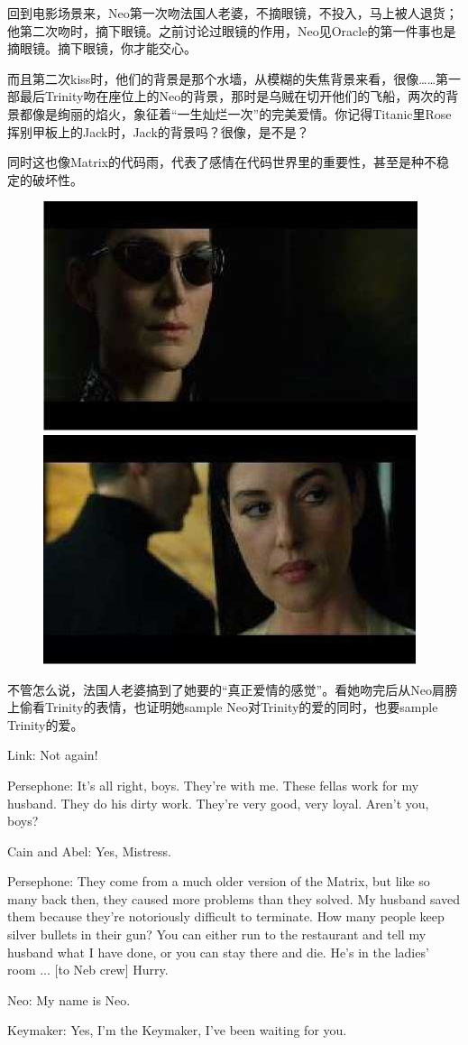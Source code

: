 \documentclass{ctexart}
\newenvironment{myquote}{\color{green} \setlength{\leftskip}{6em} \setlength{\rightskip}{4em} \setlength{\parindent}{-2em}}{\par}
\begin{document}
回到电影场景来，Neo第一次吻法国人老婆，不摘眼镜，不投入，马上被人退货；他第二次吻时，摘下眼镜。之前讨论过眼镜的作用，Neo见Oracle的第一件事也是摘眼镜。摘下眼镜，你才能交心。

而且第二次kiss时，他们的背景是那个水墙，从模糊的失焦背景来看，很像……第一部最后Trinity吻在座位上的Neo的背景，那时是乌贼在切开他们的飞船，两次的背景都像是绚丽的焰火，象征着“一生灿烂一次”的完美爱情。你记得Titanic里Rose挥别甲板上的Jack时，Jack的背景吗？很像，是不是？

同时这也像Matrix的代码雨，代表了感情在代码世界里的重要性，甚至是种不稳定的破坏性。

\begin{figure}[htb]
\centering
\includegraphics[width=0.45\linewidth]{fig/read_reloaded-107}
\includegraphics[width=0.45\linewidth]{fig/read_reloaded-107-1}
\end{figure}

不管怎么说，法国人老婆搞到了她要的“真正爱情的感觉”。看她吻完后从Neo肩膀上偷看Trinity的表情，也证明她sample Neo对Trinity的爱的同时，也要sample Trinity的爱。

\begin{myquote}
Link: Not again!

Persephone: It's all right, boys. They're with me. These fellas work for my husband. They do his dirty work. They're very good, very loyal. Aren't you, boys?

Cain and Abel: Yes, Mistress.

Persephone: They come from a much older version of the Matrix, but like so many back then, they caused more problems than they solved. My husband saved them because they're notoriously difficult to terminate. How many people keep silver bullets in their gun? You can either run to the restaurant and tell my husband what I have done, or you can stay there and die. He's in the ladies' room ... [to Neb crew] Hurry.

Neo: My name is Neo.

Keymaker: Yes, I'm the Keymaker, I've been waiting for you.
\end{myquote}
\end{document}
